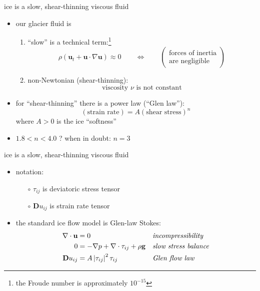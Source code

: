 \documentclass{beamer}
\begin{document}
\begin{frame}{ice is a slow, shear-thinning viscous fluid}

\begin{itemize}
\item our glacier fluid is
  \begin{enumerate}
  \item ``slow'' is a technical term:\footnote{the Froude number is approximately $10^{-15}$}
    $$\rho \left(\mathbf{u}_t + \mathbf{u}\cdot\nabla \mathbf{u}\right) \approx 0 \qquad \iff \qquad \begin{pmatrix} \text{forces of inertia} \\ \text{are negligible} \end{pmatrix}$$
  \item non-Newtonian (shear-thinning):
    $$\text{viscosity $\nu$ is not constant}$$
  \end{enumerate}

\medskip
\item for ``shear-thinning'' there is a power law (``Glen law''):
  $$(\text{strain rate}) = A (\text{shear stress})^n$$
where $A>0$ is the ice ``softness''
\item $1.8 < n < 4.0$ ?  \quad when in doubt: \alert{$n=3$}
\end{itemize}
\end{frame}


\begin{frame}{ice is a slow, shear-thinning viscous fluid}

\begin{itemize}
\item notation:
  \begin{itemize}
  \item[$\circ$] $\tau_{ij}$ is deviatoric stress tensor
  \item[$\circ$] $\mathbf{D}u_{ij}$ is strain rate tensor
  \end{itemize}
\smallskip
\item the standard ice flow model is Glen-law Stokes:
\begin{align*}
\nabla \cdot \mathbf{u} &= 0 &&\text{\emph{incompressibility}} \\
0 &= - \nabla p + \nabla \cdot \tau_{ij} + \rho \mathbf{g} &&\text{\emph{slow stress balance}} \\
\mathbf{D}u_{ij} &= A \left|\tau_{ij}\right|^2 \tau_{ij} &&\text{\emph{Glen flow law}}
\end{align*}
\end{itemize}
\end{frame}
\end{document}

